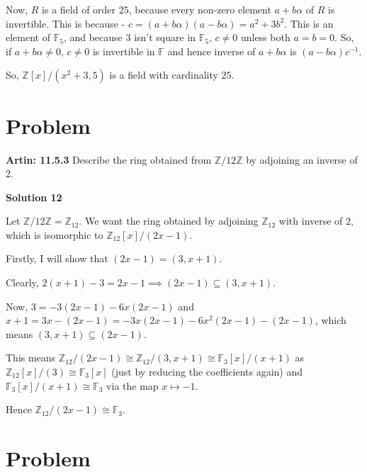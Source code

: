 \documentclass[12pt,a4paper]{article}
\theoremstyle{definition}
\begin{document}
\begin{flushleft}
Now, $R$ is a field of order $25$, because every non-zero element $a + b\alpha$ of $R$ is invertible. This is because - $c = (a+b\alpha)(a-b\alpha) = a^2 + 3b^2$. This is an element of $\mathbb{F}_5$, and because $3$ isn't  square in $\mathbb{F}_5$, $c \ne 0$ unless both $a = b = 0$. So, if $a + b\alpha \ne 0$, $c \ne 0$ is invertible in $\mathbb{F}$ and hence inverse of $a + b\alpha$ is $(a - b\alpha)c^{-1}$.

\medskip

So, $\mathbb{Z}[x]/(x^2+3,5)$ is a field with cardinality $25$.

\newpage

\setcounter{section}{11}
\section{Problem}

{\bf Artin: 11.5.3} Describe the ring obtained from $\mathbb{Z}/12\mathbb{Z}$ by adjoining an inverse of $2$.

\bigskip

{\bf Solution 12}

\medskip

Let $\mathbb{Z}/12\mathbb{Z} = \mathbb{Z}_{12}$. We want the ring obtained by adjoining $\mathbb{Z}_{12}$ with inverse of $2$, which is isomorphic to $\mathbb{Z}_{12}[x]/(2x-1)$.

\medskip

Firstly, I will show that $(2x-1) = (3,x+1)$.

Clearly, $2(x+1) - 3 = 2x-1 \implies (2x-1) \subseteq (3,x+1)$. 

Now, $3 = -3(2x-1) -6x(2x-1)$ and $x+1 = 3x - (2x-1) = -3x(2x-1) - 6x^2(2x-1) - (2x-1)$, which means $(3,x+1) \subseteq (2x-1)$.

\medskip

This means $\mathbb{Z}_{12}/(2x-1) \cong \mathbb{Z}_{12}/(3,x+1) \cong \mathbb{F}_{3}[x]/(x+1)$ as $\mathbb{Z}_{12}[x]/(3) \cong \mathbb{F}_{3}[x]$ (just by reducing the coefficients again) and $\mathbb{F}_{3}[x]/(x+1) \cong \mathbb{F}_{3}$ via the map $x \mapsto -1$.

\medskip

Hence $\mathbb{Z}_{12}/(2x-1) \cong \mathbb{F}_{3}$.

\newpage

\setcounter{section}{12}
\section{Problem}


\end{flushleft}
\end{document}
